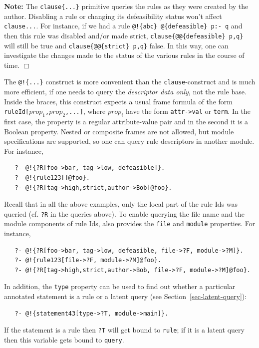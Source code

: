 \documentclass[11pt]{article}
\newcommand{\ERGO}{\mbox{\smaller{\ensuremath{\cal{E}}\smaller{{\sc{RGO}}}}}\xspace}
\newcommand{\FLSYSTEM}{\ERGO}
\begin{document}
\noindent
\textbf{Note:} The \texttt{clause\{...\}} primitive queries the rules as
they were created by the author. Disabling a rule or changing its
defeasibility status won't affect \texttt{clause{...}}.
For instance, if we had a
rule \texttt{@!\{abc\} @\{defeasible\} p:- q}
and then this rule was disabled and/or
made strict, \texttt{clause\{@@\{defeasible\} p,q\}}
will still be true and
\texttt{clause\{@@\{strict\} p,q\}} 
false. In this way, one can investigate the changes
made to the status of the various rules in the course of time.   
\hfill $\Box$

The \texttt{@!\{...\}} construct is more convenient than the
\texttt{clause}-construct and is much more efficient,
if one needs to query the \emph{descriptor data
  only}, not the rule base. Inside the braces, this construct expects a
usual frame formula of the form \texttt{ruleId[$prop_1$,$prop_2$,...]}, where
$prop_i$ have the form \texttt{attr->val} or \texttt{term}. In the first
case, the property is a regular attribute-value pair and in the second it
is a Boolean property. Nested or composite frames are not allowed, but
module specifications are supported, so one can query rule descriptors in
another module. For instance,
\begin{verbatim}
   ?- @!{?R[foo->bar, tag->low, defeasible]}.
   ?- @!{rule123[]@foo}.
   ?- @!{?R[tag->high,strict,author->Bob]@foo}.
\end{verbatim}
Recall that in all the above examples, only the local part of the rule Ids was
queried (cf. \texttt{?R} in the queries above). To enable querying the file
name and the module components of rule Ids, \FLSYSTEM also provides the
\texttt{file} and \texttt{module} properties. For instance,
\begin{verbatim}
   ?- @!{?R[foo->bar, tag->low, defeasible, file->?F, module->?M]}.
   ?- @!{rule123[file->?F, module->?M]@foo}.
   ?- @!{?R[tag->high,strict,author->Bob, file->?F, module->?M]@foo}.
\end{verbatim}
In addition, the \texttt{type}  property can be used to find out whether a particular
annotated statement is a rule or a latent query (see
Section~\ref{sec-latent-query}):
\begin{verbatim}
   ?- @!{statement43[type->?T, module->main]}.
\end{verbatim}
If the statement is a rule then \texttt{?T} will get bound to
\texttt{rule}; if it is a latent query then this variable gets
bound to \texttt{query}. 
\end{document}
